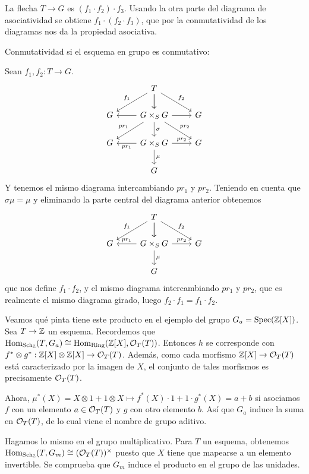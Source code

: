 \documentclass[GA.tex]{subfiles}
\begin{document}
\begin{dem}
La flecha $T\to G$ es $(f_1\cdot f_2)\cdot f_3$. Usando la otra parte del diagrama de asociatividad se obtiene $f_1\cdot (f_2\cdot f_3)$, que por la conmutatividad de los diagramas nos da la propiedad asociativa. 

Conmutatividad si el esquema en grupo es conmutativo:

Sean $f_1,f_2:T\to G$. 
\[
\begin{tikzcd}
 & T \arrow[rd, "f_2"] \arrow[d] \arrow[ld, "f_1"'] \arrow[d] &  \\
G & G\times_S G \arrow[l] \arrow[r] \arrow[d, "\sigma"] \arrow[ld, "pr_1"'] \arrow[rd, "pr_2"] & G \\
G & G\times_S G \arrow[l, "pr_1"] \arrow[r, "pr_2"] \arrow[d, "\mu"] & G \\
 & G & 
\end{tikzcd}
\]
Y tenemos el mismo diagrama intercambiando $pr_1$ y $pr_2$. Teniendo en cuenta que $\sigma\mu=\mu$ y eliminando la parte central del diagrama anterior obtenemos
 \[
\begin{tikzcd}
 & T \arrow[rd, "f_2"] \arrow[d] \arrow[ld, "f_1"'] \arrow[d] &  \\
G & G\times_S G \arrow[l, "pr_1"'] \arrow[r, "pr_2"] \arrow[d, "\mu"] & G \\
 & G & 
\end{tikzcd}
\]
que nos define $f_1\cdot f_2$, y el mismo diagrama intercambiando $pr_1$ y $pr_2$, que es realmente el mismo diagrama girado, luego $f_2\cdot f_1=f_1\cdot f_2$. 
\end{dem}


\begin{ej}
Veamos qué pinta tiene este producto en el ejemplo del grupo $G_a=\operatorname{Spec}(\mathbb{Z}[X])$. Sea $T\to\mathbb{Z}$ un esquema. Recordemos que $\operatorname{Hom}_{\operatorname{Sch}_{\mathbb{Z}}}(T,G_a)\cong\operatorname{Hom}_{\operatorname{Ring}}(\mathbb{Z}[X],{\mathcal O}_T(T))$. Entonces $h$ se corresponde con $f^*\otimes g^*:\mathbb{Z}[X]\otimes\mathbb{Z}[X]\to{\mathcal O}_T(T)$. Además, como cada morfismo $\mathbb{Z}[X]\to{\mathcal O}_T(T)$ está caracterizado por la imagen de $X$, el conjunto de tales morfismos es precisamente ${\mathcal O}_T(T)$. 

Ahora, $\mu^*(X)=X\otimes 1+1\otimes X\mapsto f^*(X)\cdot 1+1\cdot g^*(X)=a+b$ si asociamos $f$ con un elemento $a\in{\mathcal O}_T(T)$ y $g$ con otro elemento $b$. Así que $G_a$ induce la suma en ${\mathcal O}_T(T)$, de lo cual viene el nombre de grupo aditivo. 
\end{ej}

\begin{ej}
Hagamos lo mismo en el grupo multiplicativo. Para $T$ un esquema, obtenemos $\operatorname{Hom}_{\operatorname{Sch}_{\mathbb{Z}}}(T,G_m)\cong({\mathcal O}_T(T))^\times$ puesto que $X$ tiene que mapearse a un elemento invertible. Se comprueba que $G_m$ induce el producto en el grupo de las unidades. 
\end{ej}
\end{document}
